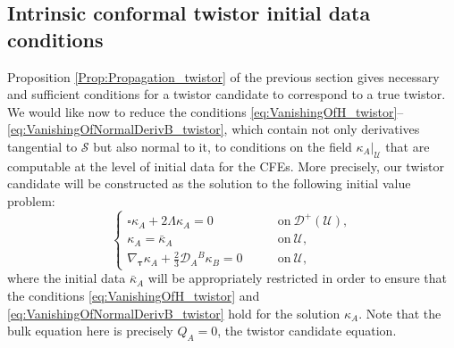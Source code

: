 \documentclass[10pt,a4paper]{article}
\theoremstyle{plain}
\begin{document}
\subsection{Intrinsic conformal twistor initial data conditions}
\label{Sec:IntrinsicTwistor}

Proposition \ref{Prop:Propagation_twistor} of the previous section
gives necessary and sufficient conditions for a twistor candidate to
correspond to a true twistor. We would like now to reduce the
conditions
\eqref{eq:VanishingOfH_twistor}--\eqref{eq:VanishingOfNormalDerivB_twistor},
which contain not only derivatives tangential to $\mathcal{S}$ but
also normal to it, to conditions on the field
$\kappa_A|_{\mathcal{U}}$ that are computable at the level of initial
data for the CFEs. More precisely, our twistor candidate will be constructed as the
solution to the following initial value problem:
\begin{equation}\label{TwistorIVP}
    \left\{
\begin{array}{ll}
	 \square \kappa_A + 2\Lambda \kappa_A=0 & \qquad
         \text{on}~\mathcal{D}^{+}(\mathcal{U}),\\ \kappa_A =
         \bar{\kappa}_A
         &\qquad\text{on}~\mathcal{U},\\ \nabla_{\bm\tau} \kappa_{A} +
         \tfrac{2}{3}\mathcal{D}_{A}{}^{B}\kappa_{B}=0
         &\qquad\text{on}~\mathcal{U},
\end{array} \right.
\end{equation}
where the initial data $\bar{\kappa}_A$ will be appropriately
restricted in order to ensure that the conditions
\eqref{eq:VanishingOfH_twistor} and
\eqref{eq:VanishingOfNormalDerivB_twistor} hold for the solution
$\kappa_A$. Note that the bulk equation here is precisely $Q_A=0$, the
twistor candidate equation.  \\
\end{document}
